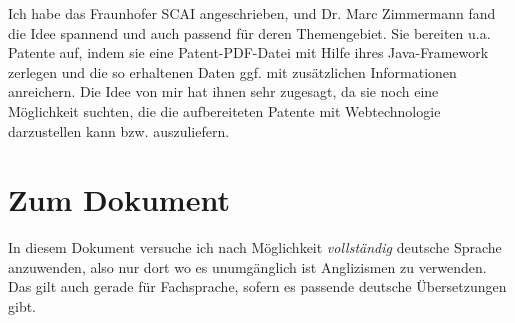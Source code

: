 Ich habe das Fraunhofer SCAI angeschrieben, und Dr. Marc Zimmermann fand
die Idee spannend und auch passend für deren Themengebiet. Sie bereiten u.a.
Patente auf, indem sie eine Patent-PDF-Datei mit Hilfe ihres Java-Framework
zerlegen und die so erhaltenen Daten ggf. mit zusätzlichen Informationen
anreichern. Die Idee von mir hat ihnen sehr zugesagt, da sie noch eine
Möglichkeit suchten, die die aufbereiteten Patente mit Webtechnologie
darzustellen kann bzw. auszuliefern.

\section{Zum Dokument}

In diesem Dokument versuche ich nach Möglichkeit \emph{vollständig}
deutsche Sprache anzuwenden, also nur dort wo es unumgänglich ist
Anglizismen zu verwenden. Das gilt auch gerade für Fachsprache, sofern es
passende deutsche Übersetzungen gibt.
